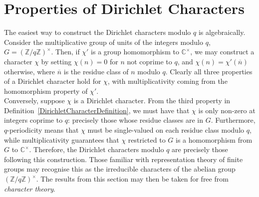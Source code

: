 \section{Properties of Dirichlet Characters}
The easiest way to construct the Dirichlet characters modulo $q$ is algebraically. Consider the multiplicative group of units of the integers modulo $q$, $G = (\mathbb{Z}/q\mathbb{Z})^{\times}$. Then, if $\chi'$ is a group homomorphism to $\mathbb{C}^{\times}$, we may construct a character $\chi$ by setting $\chi(n)=0$ for $n$ not coprime to $q$, and $\chi(n) = \chi'(\overline{n})$ otherwise, where $\overline{n}$ is the residue class of $n$ modulo $q$. Clearly all three properties of a Dirichlet character hold for $\chi$, with multiplicativity coming from the homomorphism property of $\chi'$. \\

Conversely, suppose $\chi$ is a Dirichlet character. From the third property in Definition~\ref{DirichletCharacterDefinition}, we must have that $\chi$ is only non-zero at integers coprime to $q$: precisely those whose residue classes are in $G$. Furthermore, $q$-periodicity means that $\chi$ must be single-valued on each residue class modulo $q$, while multiplicativity guarantees that $\chi$ restricted to $G$ is a homomorphism from $G$ to $\mathbb{C}^{\times}$. Therefore, the Dirichlet characters modulo $q$ are precisely those following this construction. Those familiar with representation theory of finite groups may recognise this as the irreducible characters of the abelian group $(\mathbb{Z}/q\mathbb{Z})^{\times}$. The results from this section may then be taken for free from \textit{character theory}. \\

